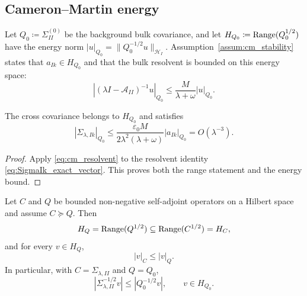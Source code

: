 \subsection{Cameron--Martin energy}

Let $Q_0\coloneqq\Sigma_{II}^{(0)}$ be the background bulk covariance, and let
$H_{Q_0}\coloneqq\operatorname{Range}(Q_0^{1/2})$ have the energy norm
$|u|_{Q_0}=\|Q_0^{-1/2}u\|_{\mathcal{H}_I}$.  Assumption~\ref{assum:cm_stability}
states that $a_{Ik}\in H_{Q_0}$ and that the bulk resolvent is bounded on this
energy space:
\begin{equation}
  |(\lambda I-\mathcal{A}_{II})^{-1}u|_{Q_0}
  \le \frac{M}{\lambda+\omega}|u|_{Q_0}.
  \label{eq:cm_resolvent}
\end{equation}

\begin{lemma}
\label{lem:finite_energy_leakage}
The cross covariance belongs to $H_{Q_0}$ and satisfies
\begin{equation}
 |\Sigma_{\lambda,Ik}|_{Q_0}
 \le
 \frac{\varepsilon_0M}{2\lambda^2(\lambda+\omega)}
 |a_{Ik}|_{Q_0}
 =O(\lambda^{-3}).
 \label{eq:cross_energy}
\end{equation}
\end{lemma}

\begin{proof}
Apply \eqref{eq:cm_resolvent} to the resolvent identity
\eqref{eq:SigmaIk_exact_vector}.  This proves both the range statement and the
energy bound.
\end{proof}

\begin{lemma}
\label{lem:form_domain_energy_domination}
Let $C$ and $Q$ be bounded non-negative self-adjoint operators on a Hilbert
space and assume $C\succeq Q$.  Then
\begin{equation}
  H_Q=\operatorname{Range}(Q^{1/2})\subseteq \operatorname{Range}(C^{1/2})=H_C,
  \label{eq:range_inclusion_CQ}
\end{equation}
and for every $v\in H_Q$,
\begin{equation}
  |v|_C\le |v|_Q.
  \label{eq:energy_domination_CQ}
\end{equation}
In particular, with $C=\Sigma_{\lambda,II}$ and $Q=Q_0$,
\begin{equation}
  |\Sigma_{\lambda,II}^{-1/2}v|
  \le |Q_0^{-1/2}v|,
  \qquad v\in H_{Q_0}.
  \label{eq:Sigma_energy_dominated_by_Q0}
\end{equation}
\end{lemma}

